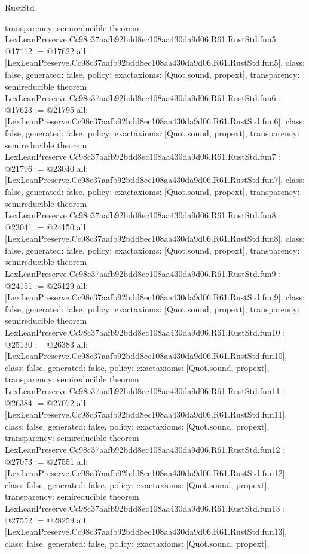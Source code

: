 \begin{lexlean}{RustStd}
\begin{coremodule}
{  transparency: semireducible
}
theorem LexLeanPreserve.Cc98c37aafb92bdd8ec108aa430da9d06.R61.RustStd.fun5 : @17112 := @17622 {
  all: [LexLeanPreserve.Cc98c37aafb92bdd8ec108aa430da9d06.R61.RustStd.fun5],
  class: false,
  generated: false,
  policy: exact{axioms: [Quot.sound, propext]},
  transparency: semireducible
}
theorem LexLeanPreserve.Cc98c37aafb92bdd8ec108aa430da9d06.R61.RustStd.fun6 : @17623 := @21795 {
  all: [LexLeanPreserve.Cc98c37aafb92bdd8ec108aa430da9d06.R61.RustStd.fun6],
  class: false,
  generated: false,
  policy: exact{axioms: [Quot.sound, propext]},
  transparency: semireducible
}
theorem LexLeanPreserve.Cc98c37aafb92bdd8ec108aa430da9d06.R61.RustStd.fun7 : @21796 := @23040 {
  all: [LexLeanPreserve.Cc98c37aafb92bdd8ec108aa430da9d06.R61.RustStd.fun7],
  class: false,
  generated: false,
  policy: exact{axioms: [Quot.sound, propext]},
  transparency: semireducible
}
theorem LexLeanPreserve.Cc98c37aafb92bdd8ec108aa430da9d06.R61.RustStd.fun8 : @23041 := @24150 {
  all: [LexLeanPreserve.Cc98c37aafb92bdd8ec108aa430da9d06.R61.RustStd.fun8],
  class: false,
  generated: false,
  policy: exact{axioms: [Quot.sound, propext]},
  transparency: semireducible
}
theorem LexLeanPreserve.Cc98c37aafb92bdd8ec108aa430da9d06.R61.RustStd.fun9 : @24151 := @25129 {
  all: [LexLeanPreserve.Cc98c37aafb92bdd8ec108aa430da9d06.R61.RustStd.fun9],
  class: false,
  generated: false,
  policy: exact{axioms: [Quot.sound, propext]},
  transparency: semireducible
}
theorem LexLeanPreserve.Cc98c37aafb92bdd8ec108aa430da9d06.R61.RustStd.fun10 : @25130 := @26383 {
  all: [LexLeanPreserve.Cc98c37aafb92bdd8ec108aa430da9d06.R61.RustStd.fun10],
  class: false,
  generated: false,
  policy: exact{axioms: [Quot.sound, propext]},
  transparency: semireducible
}
theorem LexLeanPreserve.Cc98c37aafb92bdd8ec108aa430da9d06.R61.RustStd.fun11 : @26384 := @27072 {
  all: [LexLeanPreserve.Cc98c37aafb92bdd8ec108aa430da9d06.R61.RustStd.fun11],
  class: false,
  generated: false,
  policy: exact{axioms: [Quot.sound, propext]},
  transparency: semireducible
}
theorem LexLeanPreserve.Cc98c37aafb92bdd8ec108aa430da9d06.R61.RustStd.fun12 : @27073 := @27551 {
  all: [LexLeanPreserve.Cc98c37aafb92bdd8ec108aa430da9d06.R61.RustStd.fun12],
  class: false,
  generated: false,
  policy: exact{axioms: [Quot.sound, propext]},
  transparency: semireducible
}
theorem LexLeanPreserve.Cc98c37aafb92bdd8ec108aa430da9d06.R61.RustStd.fun13 : @27552 := @28259 {
  all: [LexLeanPreserve.Cc98c37aafb92bdd8ec108aa430da9d06.R61.RustStd.fun13],
  class: false,
  generated: false,
  policy: exact{axioms: [Quot.sound, propext]},
}
\end{coremodule}
\end{lexlean}
